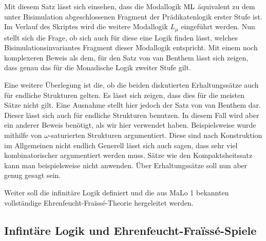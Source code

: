 Mit diesem Satz lässt sich einsehen, dass die Modallogik $\operatorname{ML}$ äquivalent zu dem unter Bisimulation abgeschlossenen Fragment der Prädikatenlogik erster Stufe ist. Im Verlauf des Skriptes wird die weitere Modallogik $L_\mu$ eingeführt werden. 
Nun stellt sich die Frage, ob sich auch für diese eine Logik finden lässt, welches Bisimulationsinvariantes Fragment dieser Modallogik entspricht. 
Mit einem noch komplexeren Beweis als dem, für den Satz von van Benthem lässt sich zeigen, dass genau das für die Monadische Logik zweiter Stufe gilt.

Eine weitere Überlegung ist die, ob die beiden diskutierten Erhaltungssätze auch für endliche Strukturen gelten. Es lässt sich zeigen, dass dies für die meisten Sätze nicht gilt. Eine Ausnahme stellt hier jedoch der Satz von van Benthem dar. Dieser lässt sich auch für endliche Strukturen benutzen.
In diesem Fall wird aber ein anderer Beweis benötigt, als wir hier verwendet haben. Beispielsweise wurde mithilfe von $\omega$-saturierten Strukturen argumentiert. Diese sind nach Konstruktion im Allgemeinen nicht endlich
Generell lässt sich auch sagen, dass sehr viel kombinatorischer argumentiert werden muss. Sätze wie den Kompaktsheitssatz kann man beispielsweise nicht anwenden. Über Erhaltungssätze soll nun aber genug gesagt sein.

Weiter soll die infinitäre Logik definiert und die aus MaLo 1 bekannten vollständige Ehrenfeucht-Fra\"{i}ss\'{e}-Theorie hergeleitet werden.


\subsection{Infintäre Logik und Ehrenfeucht-Fra\"{i}ss\'{e}-Spiele}

